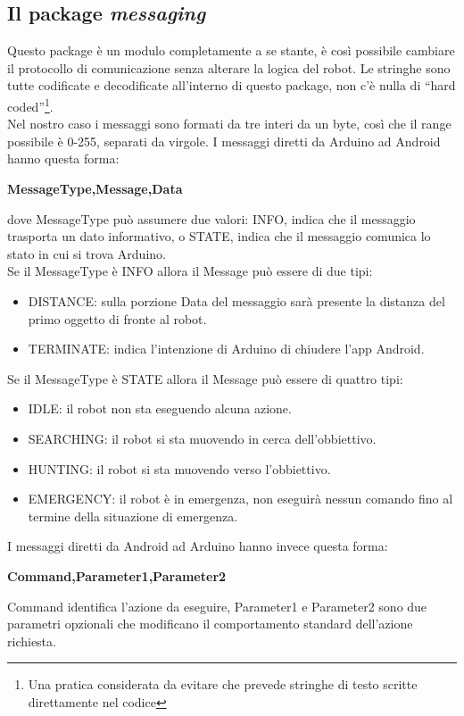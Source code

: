 \subsection{Il package \textit{messaging}}
Questo package è un modulo completamente a se stante, è così possibile cambiare il
 protocollo di comunicazione senza alterare la logica del robot. Le stringhe sono 
 tutte codificate e decodificate all'interno di questo package, non c'è nulla di 
 ``hard coded''\footnote{Una pratica considerata da evitare che prevede stringhe di 
 testo scritte direttamente nel codice}.
 \\ Nel nostro caso i messaggi sono formati da tre interi da un byte, così che il 
 range possibile è 0-255, separati da virgole.
 I messaggi diretti da Arduino ad Android hanno questa forma:
 \begin{center}
 \textbf{MessageType,Message,Data}
 \end{center}
 dove MessageType può assumere due valori: INFO, indica che il messaggio trasporta un
 dato informativo, o STATE, indica che il messaggio comunica lo stato in cui si trova Arduino.
 \\Se il MessageType è INFO allora il Message può essere di due tipi: 
 \begin{itemize}\item DISTANCE: sulla porzione Data del messaggio sarà presente 
 la distanza del primo oggetto di fronte al robot.
 \item TERMINATE: indica l'intenzione di Arduino di chiudere l'app Android.
 \end{itemize}
 Se il MessageType è STATE allora il Message può essere di quattro tipi: 
 \begin{itemize}
 	\item IDLE: il robot non sta eseguendo alcuna azione.
 	\item SEARCHING: il robot si sta muovendo in cerca dell'obbiettivo.
 	\item HUNTING: il robot si sta muovendo verso l'obbiettivo.
 	\item EMERGENCY: il robot è in emergenza, non eseguirà nessun comando fino al 
 	termine della situazione di emergenza. 
 \end{itemize}
  I messaggi diretti da Android ad Arduino hanno invece questa forma:
 \begin{center}
 \textbf{Command,Parameter1,Parameter2}
 \end{center}
 Command identifica l'azione da eseguire, Parameter1 e Parameter2 sono due parametri opzionali
 che modificano il comportamento standard dell'azione richiesta.
